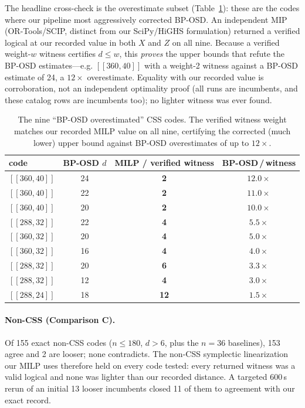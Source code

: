 \documentclass[11pt]{article}
\newcommand{\code}[1]{[\![#1]\!]}
\newcommand{\dleq}{d\!\le}
\begin{document}
The headline cross-check is the overestimate subset (Table~\ref{tab:overest}):
these are the codes where our pipeline most aggressively corrected BP-OSD. An
independent MIP (OR-Tools/SCIP, distinct from our SciPy/HiGHS formulation)
returned a verified logical at our recorded value in both $X$ and $Z$ on all
nine. Because a verified weight-$w$ witness certifies $\dleq w$, this
\emph{proves} the upper bounds that refute the BP-OSD estimates---e.g.
$\code{360,40}$ with a weight-2 witness against a BP-OSD estimate of 24, a
$12\times$ overestimate. Equality with our recorded value is corroboration, not an
independent optimality proof (all runs are incumbents, and these catalog rows are
incumbents too); no lighter witness was ever found.

\begin{table}[h]
\centering
\begin{tabular}{lccc}
\toprule
code & BP-OSD $d$ & MILP / verified witness & BP-OSD\,/\,witness \\
\midrule
$\code{360,40}$ & 24 & \textbf{2} & $\mathbf{12.0\times}$ \\
$\code{360,40}$ & 22 & \textbf{2} & $11.0\times$ \\
$\code{360,40}$ & 20 & \textbf{2} & $10.0\times$ \\
$\code{288,32}$ & 22 & \textbf{4} & $5.5\times$ \\
$\code{360,32}$ & 20 & \textbf{4} & $5.0\times$ \\
$\code{360,32}$ & 16 & \textbf{4} & $4.0\times$ \\
$\code{288,32}$ & 20 & \textbf{6} & $3.3\times$ \\
$\code{288,32}$ & 12 & \textbf{4} & $3.0\times$ \\
$\code{288,24}$ & 18 & \textbf{12} & $1.5\times$ \\
\bottomrule
\end{tabular}
\caption{The nine ``BP-OSD overestimated'' CSS codes. The verified witness weight
matches our recorded MILP value on all nine, certifying the corrected (much lower) upper
bound against BP-OSD overestimates of up to $12\times$.}
\label{tab:overest}
\end{table}

\paragraph{Non-CSS (Comparison C).} Of 155 exact non-CSS codes ($n\le180$,
$d>6$, plus the $n{=}36$ baselines), 153 agree and 2 are looser; none
contradicts. The non-CSS symplectic linearization our MILP uses therefore held on
every code tested: every returned witness was a valid logical and none was lighter
than our recorded distance. A targeted 600\,s rerun of an initial 13 looser
incumbents closed 11 of them to agreement with our exact record.
\end{document}
